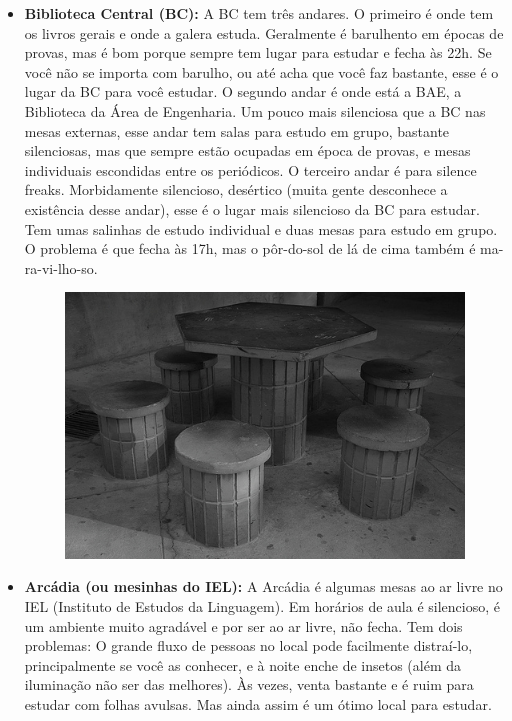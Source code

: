 \begin{itemize}
    \item  \textbf{Biblioteca Central (BC):} A BC tem três andares. O primeiro
    é onde tem os livros gerais e onde a galera estuda. Geralmente é barulhento em
    épocas de provas, mas é bom porque sempre tem lugar para estudar e fecha às 22h.
    Se você não se importa com barulho, ou até acha que você faz bastante, esse
    é o lugar da BC para você estudar. O segundo andar é onde está a BAE,
    a Biblioteca da Área de Engenharia. Um pouco mais silenciosa que a BC nas mesas
    externas, esse andar tem salas para estudo em grupo, bastante silenciosas, mas
    que sempre estão ocupadas em época de provas, e mesas individuais escondidas
    entre os periódicos. O terceiro andar é para silence freaks. Morbidamente
    silencioso, desértico (muita gente desconhece a existência desse andar), esse
    é o lugar mais silencioso da BC para estudar. Tem umas salinhas de estudo
    individual e duas mesas para estudo em grupo. O problema é que fecha às 17h, mas
    o pôr-do-sol de lá de cima também é ma-ra-vi-lho-so.

    \begin{figure}[h!]
        \centering
        \includegraphics[scale=0.60, keepaspectratio=true]{img/imgs/11-lugares_estudar/-072.jpg}
    \end{figure}

    \item  \textbf{Arcádia (ou mesinhas do IEL):} A Arcádia é algumas mesas ao ar
    livre no IEL (Instituto de Estudos da Linguagem). Em horários de aula
    é silencioso, é um ambiente muito agradável e por ser ao ar livre, não fecha.
    Tem dois problemas: O grande fluxo de pessoas no local pode facilmente
    distraí-lo, principalmente se você as conhecer, e à noite enche de insetos (além
    da iluminação não ser das melhores). Às vezes, venta bastante e é ruim para
    estudar com folhas avulsas. Mas ainda assim é um ótimo local para estudar.


\end{itemize}
